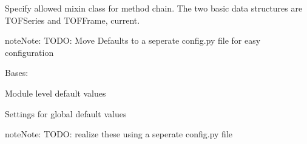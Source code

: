 \documentclass[letterpaper,10pt,english]{sphinxmanual}
\begin{document}
\begin{fulllineitems}
\label{\detokenize{scibeam.core:scibeam.core.base._mixin_class}}
 \textendash{} Specify allowed mixin class for method chain.
The two basic data structures are TOFSeries and TOFFrame,
current.

\end{fulllineitems}


\begin{sphinxadmonition}{note}{Note:}
TODO: Move Defaults to a seperate config.py file for easy
configuration
\end{sphinxadmonition}

\begin{fulllineitems}
\label{\detokenize{scibeam.core:scibeam.core.base.Defaults}}
Bases: 

Module level default values

Settings for global default values

\begin{sphinxadmonition}{note}{Note:}
TODO: realize these using a seperate config.py file
\end{sphinxadmonition}

\begin{fulllineitems}
\label{\detokenize{scibeam.core:scibeam.core.base.Defaults.data_file_extenstion}}
\end{fulllineitems}


\begin{fulllineitems}
\label{\detokenize{scibeam.core:scibeam.core.base.Defaults.data_file_num_column}}
\end{fulllineitems}


\begin{fulllineitems}
\label{\detokenize{scibeam.core:scibeam.core.base.Defaults.file_regex}}
\end{fulllineitems}


\end{fulllineitems}
\end{document}
